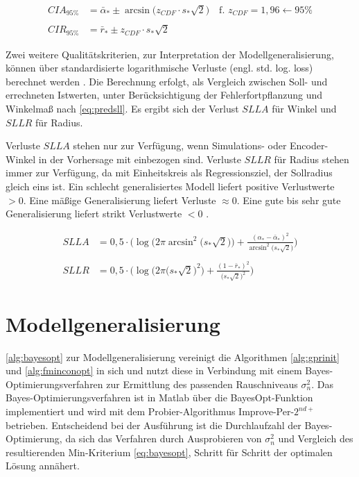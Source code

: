 \begin{align}\label{eq:predci}
	CIA_{95\%} &= \bar{\alpha}_* \pm \arcsin \big( z_{CDF} \cdot s_* \sqrt{2} \big) \quad \text{f. } z_{CDF} = 1,96 \leftarrow 95\% \nonumber \\
	\\
	CIR_{95\%} &= \bar{r}_* \pm z_{CDF} \cdot s_* \sqrt{2} \nonumber
\end{align}


Zwei weitere Qualitätskriterien, zur Interpretation der Modellgeneralisierung, können über standardisierte logarithmische Verluste (engl. std. log. loss) berechnet werden \cite{Rasmussen2006}. Die Berechnung erfolgt, als Vergleich zwischen Soll- und errechneten Istwerten, unter Berücksichtigung der Fehlerfortpflanzung und Winkelmaß nach \autoref{eq:predsll}. Es ergibt sich der Verlust $SLLA$ für Winkel und $SLLR$ für Radius.


\clearpage


Verluste $SLLA$ stehen nur zur Verfügung, wenn Simulations- oder Encoder-Winkel in der Vorhersage mit einbezogen sind. Verluste $SLLR$ für Radius stehen immer zur Verfügung, da mit Einheitskreis als Regressionsziel, der Sollradius gleich eins ist. Ein schlecht generalisiertes Modell liefert positive Verlustwerte $>0$. Eine mäßige Generalisierung liefert Verluste $\approx 0$. Eine gute bis sehr gute Generalisierung liefert strikt Verlustwerte $<0$ \cite{Rasmussen2006}.


\begin{align}\label{eq:predsll}
	SLLA &= 0,5 \cdot \bigg( \log \big( 2\pi \arcsin^2 \big( s_* \sqrt{2}) \big) + \frac{(\alpha_* - \bar{\alpha}_*)^2}{\arcsin^2 \big( s_* \sqrt{2} \big)}\bigg) \nonumber \\
	\\
	SLLR &= 0,5 \cdot \bigg( \log \big( 2\pi \big( s_* \sqrt{2} \big)^2 \big) + \frac{(1 - \bar{r}_*)^2}{\big( s_* \sqrt{2} \big)^2}\bigg) \nonumber
\end{align}


\section{Modellgeneralisierung}\label{sec:gprgen}


\autoref{alg:bayesopt} zur Modellgeneralisierung vereinigt die Algorithmen \ref{alg:gprinit} und \ref{alg:fminconopt} in sich und nutzt diese in Verbindung mit einem Bayes-Optimierungsverfahren zur Ermittlung des passenden Rauschniveaus $\sigma_n^2$. Das Bayes-Optimierungsverfahren ist in Matlab über die BayesOpt-Funktion implementiert und wird mit dem Probier-Algorithmus Improve-Per-$2^{nd+}$ betrieben. Entscheidend bei der Ausführung ist die Durchlaufzahl der Bayes-Optimierung, da sich das Verfahren durch Ausprobieren von $\sigma_n^2$ und Vergleich des resultierenden Min-Kriterium \autoref{eq:bayesopt}, Schritt für Schritt der optimalen Lösung annähert. 


